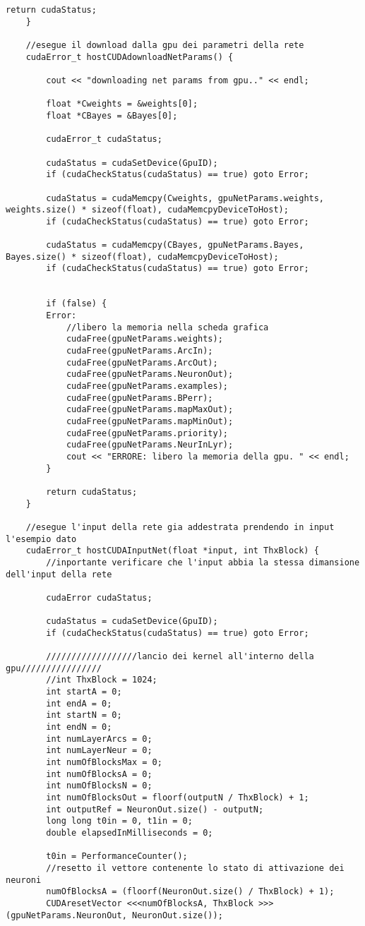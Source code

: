 \documentclass[10pt,a4paper]{article}
\begin{document}
\begin{lstlisting}[style=mycuda, caption=librerie usate, captionpos=b]
		return cudaStatus;
	}

	//esegue il download dalla gpu dei parametri della rete
	cudaError_t hostCUDAdownloadNetParams() {

		cout << "downloading net params from gpu.." << endl;

		float *Cweights = &weights[0];
		float *CBayes = &Bayes[0];

		cudaError_t cudaStatus;

		cudaStatus = cudaSetDevice(GpuID);
		if (cudaCheckStatus(cudaStatus) == true) goto Error;

		cudaStatus = cudaMemcpy(Cweights, gpuNetParams.weights, weights.size() * sizeof(float), cudaMemcpyDeviceToHost);
		if (cudaCheckStatus(cudaStatus) == true) goto Error;

		cudaStatus = cudaMemcpy(CBayes, gpuNetParams.Bayes, Bayes.size() * sizeof(float), cudaMemcpyDeviceToHost);
		if (cudaCheckStatus(cudaStatus) == true) goto Error;


		if (false) {
		Error:
			//libero la memoria nella scheda grafica
			cudaFree(gpuNetParams.weights);
			cudaFree(gpuNetParams.ArcIn);
			cudaFree(gpuNetParams.ArcOut);
			cudaFree(gpuNetParams.NeuronOut);
			cudaFree(gpuNetParams.examples);
			cudaFree(gpuNetParams.BPerr);
			cudaFree(gpuNetParams.mapMaxOut);
			cudaFree(gpuNetParams.mapMinOut);
			cudaFree(gpuNetParams.priority);
			cudaFree(gpuNetParams.NeurInLyr);
			cout << "ERRORE: libero la memoria della gpu. " << endl;
		}

		return cudaStatus;
	}

	//esegue l'input della rete gia addestrata prendendo in input l'esempio dato 
	cudaError_t hostCUDAInputNet(float *input, int ThxBlock) {
		//inportante verificare che l'input abbia la stessa dimansione dell'input della rete

		cudaError cudaStatus;

		cudaStatus = cudaSetDevice(GpuID);
		if (cudaCheckStatus(cudaStatus) == true) goto Error;

		//////////////////lancio dei kernel all'interno della gpu////////////////
		//int ThxBlock = 1024;
		int startA = 0;
		int endA = 0;
		int startN = 0;
		int endN = 0;
		int numLayerArcs = 0;
		int numLayerNeur = 0;
		int numOfBlocksMax = 0;
		int numOfBlocksA = 0;
		int numOfBlocksN = 0;
		int numOfBlocksOut = floorf(outputN / ThxBlock) + 1;
		int outputRef = NeuronOut.size() - outputN;
		long long t0in = 0, t1in = 0;
		double elapsedInMilliseconds = 0;
			
		t0in = PerformanceCounter();
		//resetto il vettore contenente lo stato di attivazione dei neuroni
		numOfBlocksA = (floorf(NeuronOut.size() / ThxBlock) + 1);
		CUDAresetVector <<<numOfBlocksA, ThxBlock >>> (gpuNetParams.NeuronOut, NeuronOut.size());


\end{lstlisting}
\end{document}
